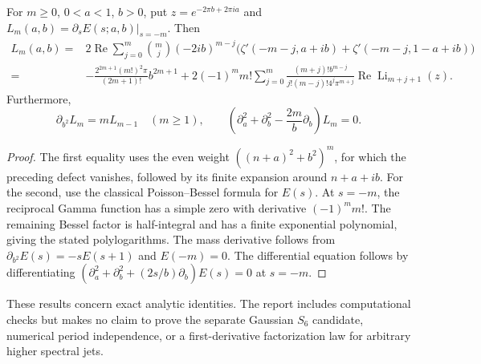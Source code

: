\begin{theorem}
\label{qspec:frag:finite}
For $m\ge0$, $0<a<1$, $b>0$, put $z=e^{-2\pi b+2\pi ia}$ and
$L_m(a,b)=\partial_sE(s;a,b)|_{s=-m}$. Then
\begin{align*}
L_m(a,b)
={}&2\operatorname{Re}\sum_{j=0}^m\binom mj(-2ib)^{m-j}
\bigl(\zeta'(-m-j,a+ib)+\zeta'(-m-j,1-a+ib)\bigr)\\
={}&-\frac{2^{2m+1}(m!)^2\pi}{(2m+1)!}b^{2m+1}
+2(-1)^mm!\sum_{j=0}^m
\frac{(m+j)!b^{m-j}}{j!(m-j)!4^j\pi^{m+j}}
\operatorname{Re}\operatorname{Li}_{m+j+1}(z).
\end{align*}
Furthermore,
\[
\partial_{b^2}L_m=mL_{m-1}\quad(m\ge1),\qquad
\left(\partial_a^2+\partial_b^2-\frac{2m}{b}\partial_b\right)L_m=0.
\]
\end{theorem}
\begin{proof}
The first equality uses the even weight $((n+a)^2+b^2)^m$, for which
the preceding defect vanishes, followed by its finite expansion around
$n+a+ib$. For the second, use the classical Poisson--Bessel formula
for $E(s)$. At $s=-m$, the reciprocal Gamma function has a simple zero
with derivative $(-1)^mm!$. The remaining Bessel factor is half-integral
and has a finite exponential polynomial, giving the stated polylogarithms.
The mass derivative follows from $\partial_{b^2}E(s)=-sE(s+1)$ and
$E(-m)=0$. The differential equation follows by differentiating
$(\partial_a^2+\partial_b^2+(2s/b)\partial_b)E(s)=0$ at $s=-m$.
\end{proof}

These results concern exact analytic identities. The report includes
computational checks but makes no claim to prove the separate Gaussian
$S_6$ candidate, numerical period independence, or a first-derivative
factorization law for arbitrary higher spectral jets.
